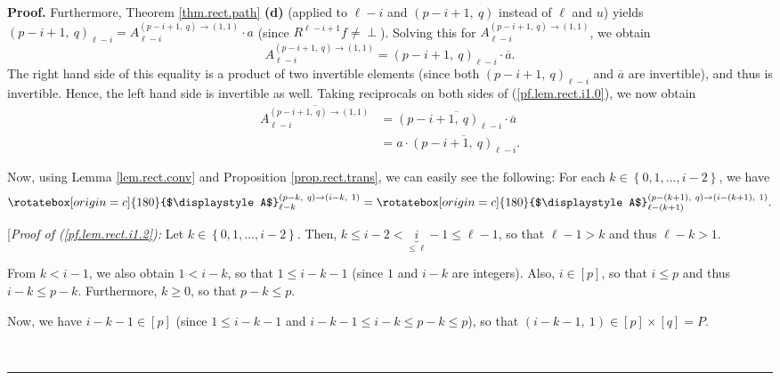 \documentclass[numbers=enddot,12pt,final,onecolumn,notitlepage]{scrartcl}%
\theoremstyle{definition}
\newenvironment{verlong}{}{}
\newcommand{\undf}{\operatorname*{\bot}}
\newcommand{\upslack}{\mathchoice{\rotatebox[origin=c]{180}{$\displaystyle A$}}{\rotatebox[origin=c]{180}{$\textstyle A$}}{\rotatebox[origin=c]{180}{$\scriptstyle A$}}{\rotatebox[origin=c]{180}{$\scriptscriptstyle A$}}}
\newcommand{\downslack}{A}
\newenvironment{proof}[1][Proof]{\noindent\textbf{#1.} }{\ \rule{0.5em}{0.5em}}
\begin{document}
\begin{verlong}
\begin{proof}
Furthermore, Theorem \ref{thm.rect.path} \textbf{(d)} (applied to $\ell-i$ and
$\left(  p-i+1,\ q\right)  $ instead of $\ell$ and $u$) yields $\left(
p-i+1,\ q\right)  _{\ell-i}=\downslack_{\ell-i}^{\left(  p-i+1,\ q\right)
\rightarrow\left(  1,1\right)  }\cdot a$ (since $R^{\ell-i+1}f\neq\undf$).
Solving this for $\downslack_{\ell-i}^{\left(  p-i+1,\ q\right)
\rightarrow\left(  1,1\right)  }$, we obtain
\begin{equation}
\downslack_{\ell-i}^{\left(  p-i+1,\ q\right)  \rightarrow\left(  1,1\right)
}=\left(  p-i+1,\ q\right)  _{\ell-i}\cdot\overline{a}.
\label{pf.lem.rect.i1.0}%
\end{equation}
The right hand side of this equality is a product of two invertible elements
(since both $\left(  p-i+1,\ q\right)  _{\ell-i}$ and $\overline{a}$ are
invertible), and thus is invertible. Hence, the left hand side is invertible
as well. Taking reciprocals on both sides of (\ref{pf.lem.rect.i1.0}), we now
obtain%
\begin{align}
\overline{\downslack_{\ell-i}^{\left(  p-i+1,\ q\right)  \rightarrow\left(
1,1\right)  }}  &  =\overline{\left(  p-i+1,\ q\right)  _{\ell-i}%
\cdot\overline{a}}\nonumber\\
&  =a\cdot\overline{\left(  p-i+1,\ q\right)  _{\ell-i}}.
\label{pf.lem.rect.i1.1}%
\end{align}


Now, using Lemma \ref{lem.rect.conv} and Proposition \ref{prop.rect.trans}, we
can easily see the following: For each $k\in\left\{  0,1,\ldots,i-2\right\}
$, we have%
\begin{equation}
\upslack_{\ell-k}^{\left(  p-k,\ q\right)  \rightarrow\left(  i-k,\ 1\right)
}=\upslack_{\ell-\left(  k+1\right)  }^{\left(  p-\left(  k+1\right)
,\ q\right)  \rightarrow\left(  i-\left(  k+1\right)  ,\ 1\right)  }.
\label{pf.lem.rect.i1.2}%
\end{equation}


[\textit{Proof of (\ref{pf.lem.rect.i1.2}):} Let $k\in\left\{  0,1,\ldots
,i-2\right\}  $. Then, $k\leq i-2<\underbrace{i}_{\leq\ell}-1\leq\ell-1$, so
that $\ell-1>k$ and thus $\ell-k>1$.

From $k<i-1$, we also obtain $1<i-k$, so that $1\leq i-k-1$ (since $1$ and
$i-k$ are integers). Also, $i\in\left[  p\right]  $, so that $i\leq p$ and
thus $i-k\leq p-k$. Furthermore, $k\geq0$, so that $p-k\leq p$.

Now, we have $i-k-1\in\left[  p\right]  $ (since $1\leq i-k-1$ and $i-k-1\leq
i-k\leq p-k\leq p$), so that $\left(  i-k-1,\ 1\right)  \in\left[  p\right]
\times\left[  q\right]  =P$.


\end{proof}
\end{verlong}
\end{document}
